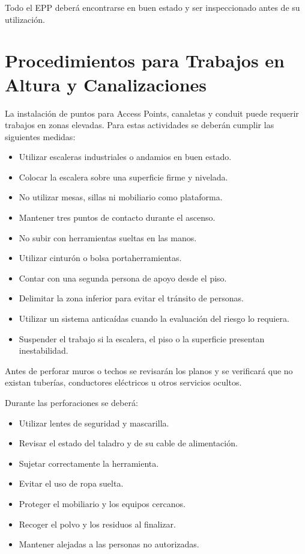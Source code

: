 Todo el EPP deberá encontrarse en buen estado y ser inspeccionado antes de su utilización.

\section{Procedimientos para Trabajos en Altura y Canalizaciones}

La instalación de puntos para Access Points, canaletas y conduit puede requerir trabajos en zonas elevadas. Para estas actividades se deberán cumplir las siguientes medidas:

\begin{itemize}
    \item Utilizar escaleras industriales o andamios en buen estado.
    \item Colocar la escalera sobre una superficie firme y nivelada.
    \item No utilizar mesas, sillas ni mobiliario como plataforma.
    \item Mantener tres puntos de contacto durante el ascenso.
    \item No subir con herramientas sueltas en las manos.
    \item Utilizar cinturón o bolsa portaherramientas.
    \item Contar con una segunda persona de apoyo desde el piso.
    \item Delimitar la zona inferior para evitar el tránsito de personas.
    \item Utilizar un sistema anticaídas cuando la evaluación del riesgo lo requiera.
    \item Suspender el trabajo si la escalera, el piso o la superficie presentan inestabilidad.
\end{itemize}

Antes de perforar muros o techos se revisarán los planos y se verificará que no existan tuberías, conductores eléctricos u otros servicios ocultos.

Durante las perforaciones se deberá:

\begin{itemize}
    \item Utilizar lentes de seguridad y mascarilla.
    \item Revisar el estado del taladro y de su cable de alimentación.
    \item Sujetar correctamente la herramienta.
    \item Evitar el uso de ropa suelta.
    \item Proteger el mobiliario y los equipos cercanos.
    \item Recoger el polvo y los residuos al finalizar.
    \item Mantener alejadas a las personas no autorizadas.
\end{itemize}

